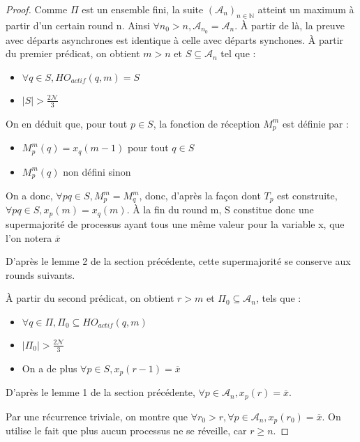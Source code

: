 \documentclass{article}
\begin{document}
\begin{proof}

	Comme $\Pi$ est un ensemble fini, la suite $(\mathcal{A}_n)_{n \in \mathds{N}}$ atteint un maximum à partir d'un certain round n.
	Ainsi $\forall n_0 > n, \mathcal{A}_{n_0} = \mathcal{A}_n$.
	À partir de là, la preuve avec départs asynchrones est identique à celle avec départs synchones. 
	À partir du premier prédicat, on obtient $m > n$ et $S \subseteq \mathcal{A}_n$ tel que :
	\begin{itemize}

		\item $\forall q \in S, HO_{actif}(q, m) = S$
		\item $|S| > \frac{2\mathcal{N}}{3}$

	\end{itemize}

	On en déduit que, pour tout $p \in S$, la fonction de réception $M_p^m$ est définie par :
	\begin{itemize}

		\item $M_p^m(q) = x_q(m-1)$ pour tout $q \in S$
		\item $M_p^m(q)$ non défini sinon

	\end{itemize}

	On a donc, $\forall p q \in S, M_p^m = M_q^m$, donc, d'après la façon dont $T_p$ est construite, $\forall p q \in S, x_p(m) = x_q(m)$.
	À la fin du round m, S constitue donc une supermajorité de processus ayant tous une même valeur pour la variable x, que l'on notera $\overline{x}$

D'après le lemme 2 de la section précédente, cette supermajorité se conserve aux rounds suivants.

	À partir du second prédicat, on obtient $r > m$ et $\Pi_0 \subseteq \mathcal{A}_n$, tels que :
	\begin{itemize}

		\item $\forall q \in \Pi, \Pi_0 \subseteq HO_{actif}(q, m)$
		\item $|\Pi_0| > \frac{2\mathcal{N}}{3}$
		\item On a de plus $\forall p \in S, x_p(r-1) = \overline{x}$

	\end{itemize}

	D'après le lemme 1 de la section précédente, $\forall p \in \mathcal{A}_n, x_p(r) = \overline{x}$.

	Par une récurrence triviale, on montre que  $\forall r_0 > r, \forall p \in \mathcal{A}_n, x_p(r_0) = \overline{x}$.
	On utilise le fait que plus aucun processus ne se réveille, car $r \geq n$.



\end{proof}
\end{document}
